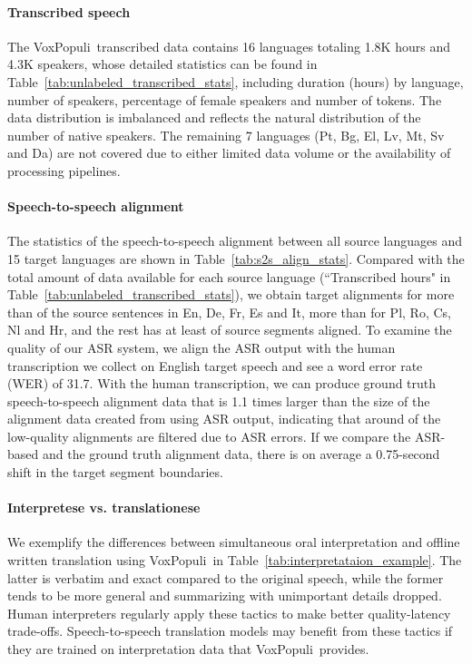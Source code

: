 \documentclass[11pt,a4paper]{article}
\newcommand{\vp}{VoxPopuli}
\begin{document}
\paragraph{Transcribed speech} The \vp~transcribed data contains 16 languages totaling 1.8K hours and 4.3K speakers, whose detailed statistics can be found in Table~\ref{tab:unlabeled_transcribed_stats}, including duration (hours) by language, number of speakers, percentage of female speakers and number of tokens. The data distribution is imbalanced and reflects the natural distribution of the number of native speakers. The remaining 7 languages (Pt, Bg, El, Lv, Mt, Sv and Da) are not covered due to either limited data volume or the availability of processing pipelines.

\paragraph{Speech-to-speech alignment} The statistics of the speech-to-speech alignment between all source languages and 15 target languages are shown in Table~\ref{tab:s2s_align_stats}. Compared with the total amount of data available for each source language (``Transcribed hours" in Table~\ref{tab:unlabeled_transcribed_stats}), we obtain target alignments for more than  of the source sentences in En, De, Fr, Es and It, more than  for Pl, Ro, Cs, Nl and Hr, and the rest has at least  of source segments aligned. To examine the quality of our ASR system, we align the ASR output with the human transcription we collect on English target speech and see a word error rate (WER) of 31.7. With the human transcription, we can produce ground truth speech-to-speech alignment data that is 1.1 times larger than the size of the alignment data created from using ASR output, indicating that around  of the low-quality alignments are filtered due to ASR errors. If we compare the ASR-based and the ground truth alignment data, there is on average a 0.75-second shift in the target segment boundaries.

\paragraph{Interpretese vs. translationese} We exemplify the differences between simultaneous oral interpretation and offline written translation using \vp~in Table~\ref{tab:interpretataion_example}. The latter is verbatim and exact compared to the original speech, while the former tends to be more general and summarizing with unimportant details dropped. Human interpreters regularly apply these tactics to make better quality-latency trade-offs. Speech-to-speech translation models may benefit from these tactics if they are trained on interpretation data that \vp~provides.
\end{document}
